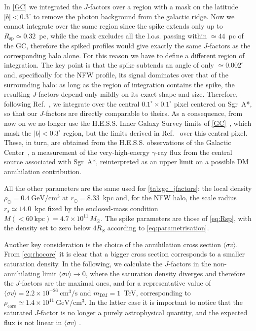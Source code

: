 In \cref{GC} we integrated the $J$-factors over a region with a mask on the latitude $|b| < 0.3^\circ$ to remove the photon background from the galactic
ridge. Now we cannot integrate over the same region since the spike extends only up to $R_{\mathrm{sp}} \simeq 0.32$~pc, 
while the mask excludes all the l.o.s. passing within $\simeq 44$~pc of the GC, therefore the spiked profiles would give exactly the same $J$-factors as the corresponding halo alone.
For this reason we have to define a different region of integration. 
The key point is that the spike subtends an angle of only $\simeq 0.002^\circ$ 
and, specifically for the NFW profile, its signal dominates over that of the surrounding halo: as long as the region of integration contains the spike, the resulting $J$-factors depend only mildly on its exact shape and size.
Therefore, following Ref.~\cite{balaji2023darkmatterspikessgr}, we integrate over
the central $0.1^\circ\times 0.1^\circ$ pixel centered on Sgr~A*, so that our
$J$-factors are directly comparable to theirs.
As a consequence, from now on we no longer use the H.E.S.S. Inner Galaxy
Survey limits of \cref{GC}~\cite{Abdalla_2022}, which mask the $|b|<0.3^\circ$
region, but the limits derived in Ref.~\cite{balaji2023darkmatterspikessgr}
over this central pixel.
These, in turn, are obtained from the H.E.S.S.
observations of the Galactic Center~\cite{HESS_PeVatron_2016},
a measurement of
the very-high-energy $\gamma$-ray flux from the central source associated with
Sgr~A*, reinterpreted as an upper limit on a possible DM annihilation
contribution.

All the other parameters are the same used for \cref{tab:gc_jfactors}: the
local density $\rho_\odot = 0.4~\mathrm{GeV/cm^3}$ at
$r_\odot = 8.33$~kpc and, for the NFW halo, the scale radius
$r_s \simeq 14.0$~kpc fixed by the enclosed-mass condition
$M(<60~\mathrm{kpc}) = 4.7\times 10^{11}\,M_\odot$.
The spike parameters are
those of \cref{eq:Rsp}, with the density set to zero below $4R_S$ according
to \cref{eq:parametrisation}.

Another key consideration is the choice of the annihilation cross section $\langle\sigma v\rangle$. 
From \cref{eq:rhocore} it is clear that a bigger cross section corresponds to a smaller saturation density.
In the following, we calculate the $J$-factors in the non-annihilating limit $\langle\sigma v\rangle \to 0$, where the saturation density diverges and therefore the $J$-factors are the maximal ones,
and for a representative value of $\langle\sigma v\rangle = 2.2\times 10^{-26}~\mathrm{cm^3/s}$ and $m_{\mathrm{DM}} = 1$~TeV, corresponding to $\rho_{\mathrm{core}} \simeq 1.4\times 10^{11}~\mathrm{GeV/cm^3}$.
In the latter case it is important to notice that the saturated $J$-factor is
no longer a purely astrophysical quantity, and the expected flux is not
linear in $\langle\sigma v\rangle$ \cite{balaji2023darkmatterspikessgr}.

